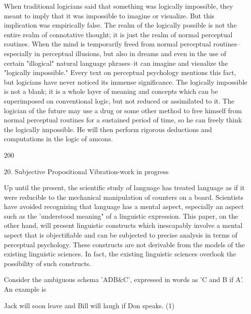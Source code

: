 \documentclass[10pt,twoside]{memoir}
\begin{document}
\begin{enumerate}
{\begin{enumerate}
\begin{sysrules}
\begin{sysrules}
\begin{sysrules}
\begin{sysrules}
{\begin{enumerate}
{{{{{{{{{When traditional logicians said that something was logically impossible, 
they meant to imply that it was impossible to imagine or visualize. But this 
implication was empirically false. The realm of the logically possible is not 
the entire realm of connotative thought; it is just the realm of normal 
perceptual routines. When the mind is temporarily freed from normal 
perceptual routines--especially in perceptual illusions, but also in dreams and 
even in the use of certain "illogical" natural language phrases--it can imagine 
and visualize the "logically impossible." Every text on perceptual 
psychology mentions this fact, but logicians have never noticed its immense 
significance. The logically impossible is not a blank; it is a whole layer of 
meaning and concepts which can be superimposed on conventional logic, but 
not reduced or assimilated to it. The logician of the future may use a drug or 
some other method to free himself from normal perceptual routines for a 
sustained period of time, so he can freely think the logically impossible. He 
will then perform rigorous deductions and computations in the logic of 
amcons. 


200 


20. Subjective Propositional Vibration-work in progress 


Up until the present, the scientific study of language has treated 
language as if it were reducible to the mechanical manipulation of counters 
on a board. Scientists have avoided recognizing that language has a mental 
aspect, especially an aspect such as the 'understood meaning" of a linguistic 
expression. This paper, on the other hand, will present linguistic constructs 
which inescapably involve a mental aspect that is objectifiable and can be 
subjected to precise analysis in terms of perceptual psychology. These 
constructs are not derivable from the models of the existing linguistic 
sciences. In fact, the existing linguistic sciences overlook the possibility of 
such constructs. 

Consider the ambiguous schema 'ADB&C', expressed in words as 'C and 
B if A'. An example is 

Jack will soon leave and Bill will laugh if Don speaks. (1) 

}}}}}}}}}
\end{enumerate}}
\end{sysrules}
\end{sysrules}
\end{sysrules}
\end{sysrules}
\end{enumerate}}
\end{enumerate}
\end{document}
